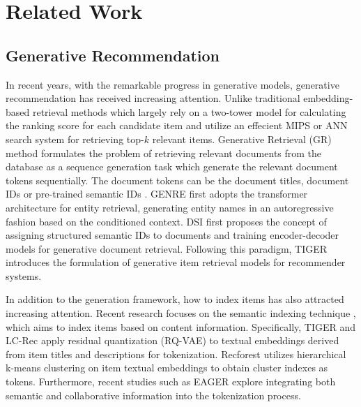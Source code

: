 \section{Related Work}
\subsection{Generative Recommendation}
In recent years, with the remarkable progress in generative models, generative recommendation has received increasing attention. Unlike traditional embedding-based retrieval methods which largely rely on a two-tower model for calculating the ranking score for each candidate item and utilize an effecient MIPS or ANN \cite{houle2014rank,muja2014scalable, shrivastava2014asymmetric, ge2013optimized,jegou2010product} search system for retrieving top-$k$ relevant items. Generative Retrieval (GR) \cite{tang2023recent} method formulates the problem of retrieving relevant documents from the database as a sequence generation task which generate the relevant document tokens sequentially. The document tokens can be the document titles, document IDs or pre-trained semantic IDs \cite{tay2022transformer}. GENRE \cite{de2020autoregressive} first adopts the transformer architecture for entity retrieval, generating entity names in an autoregressive fashion based on the conditioned context. DSI \cite{tay2022transformer} first proposes the concept of assigning structured semantic IDs to documents and training encoder-decoder models for generative document retrieval. Following this paradigm, TIGER \cite{rajput2023recommender} introduces the formulation of generative item retrieval models for recommender systems. 

In addition to the generation framework, how to index items has also attracted increasing attention. Recent research focuses on the semantic indexing technique \cite{rajput2023recommender,tay2022transformer, feng2022recommender}, which aims to index items based on content information. Specifically, TIGER \cite{rajput2023recommender} and LC-Rec \cite{zheng2024adapting} apply residual quantization (RQ-VAE) to textual embeddings derived from item titles and descriptions for tokenization. Recforest \cite{feng2022recommender} utilizes hierarchical k-means clustering on item textual embeddings to obtain cluster indexes as tokens. Furthermore, recent studies such as EAGER \cite{wang2024eager} explore integrating both semantic and collaborative information into the tokenization process. 

